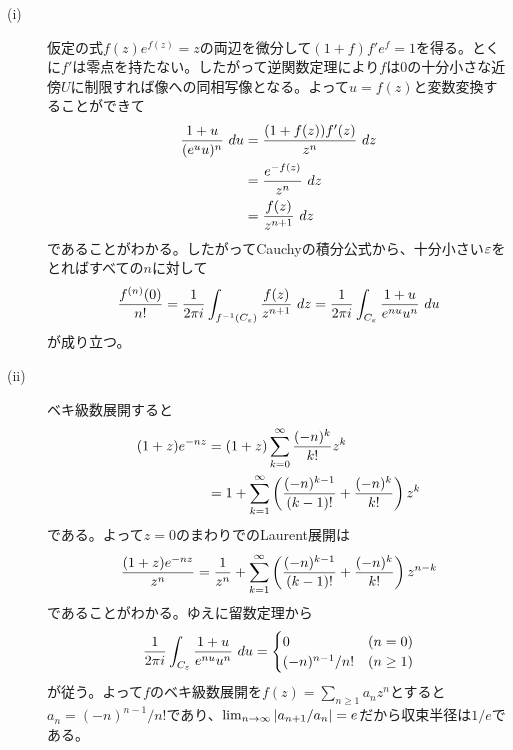 \begin{sol} ${}$
  \begin{description}
    \item[(i)] 仮定の式$f(z)e^{f(z)} = z$の両辺を微分して$(1 + f)f' e^f = 1$を得る。とくに$f'$は零点を持たない。したがって逆関数定理により$f$は$0$の十分小さな近傍$U$に制限すれば像への同相写像となる。よって$u = f(z)$と変数変換することができて
    \begin{align*}
      \frac{1 + u}{ (e^u u)^n} \ du &= \frac{(1 + f(z))f'(z) }{z^n} \ dz \\
      &= \frac{ e^{-f(z)} }{z^n} \ dz \\
      &= \frac{f(z)}{z^{n+1}} \ dz
    \end{align*}
    であることがわかる。したがってCauchyの積分公式から、十分小さい${\varepsilon}$をとればすべての$n$に対して
    \[
\frac{ f^{(n)}(0) }{ n!} =  \frac{1}{2\pi i} \int_{f^{-1}(C_{{\varepsilon}})} \frac{f(z)}{z^{n+1}} \ dz  = \frac{1}{2\pi i} \int_{C_{{\varepsilon}}} \frac{1+u}{e^{nu} u^n} \ du
    \]
    が成り立つ。
    \item[(ii)] ベキ級数展開すると
    \begin{align*}
      (1 + z)e^{-nz} &= (1 + z) \sum_{k=0}^{\infty} \frac{ (-n)^k }{k!} z^k \\
      &= 1 + \sum_{k=1}^{\infty} \left( \frac{ (-n)^{k-1} }{ (k-1)! } + \frac{ (-n)^k }{k!} \right) z^{k}
    \end{align*}
    である。よって$z=0$のまわりでのLaurent展開は
    \[
    \frac{ (1 + z)e^{-nz} }{z^n} = \frac{1}{z^n} + \sum_{k=1}^{\infty} \left( \frac{ (-n)^{k-1} }{ (k-1)! } + \frac{ (-n)^k }{k!} \right) z^{n-k}
    \]
    であることがわかる。ゆえに留数定理から
    \[
    \frac{1}{2\pi i} \int_{C_{{\varepsilon}}} \frac{1+u}{e^{nu} u^n} \ du = \begin{cases}
    0 &(n=0) \\
    (-n)^{n-1}/ n! &(n \geq 1)
  \end{cases}
    \]
    が従う。よって$f$のベキ級数展開を$f(z) = \sum_{n \geq 1} a_n z^n$とすると$a_n=(-n)^{n-1}/n!$であり、$\lim_{n \to \infty} \left \lvert a_{n+1} / a_n \right \rvert = e$だから収束半径は$1/e$である。
  \end{description}
\end{sol}

